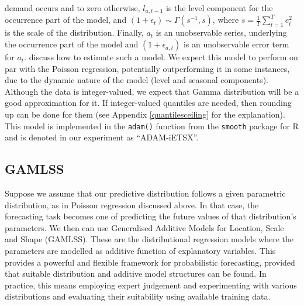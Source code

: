 \documentclass[]{elsarticle} %
\begin{document}
demand occurs and to zero otherwise, \(l_{a,t-1}\) is the level component
for the occurrence part of the model, and
\(\left(1+\epsilon_t \right) \sim \Gamma(s^{-1}, s)\), where
\(s=\frac{1}{T} \sum_{t=1}^{T} e_{t}^2\) is the scale of the distribution.
Finally, \(a_t\) is an unobservable series, underlying the occurrence part
of the model and \((1 + \epsilon_{a,t})\) is an unobservable error term
for \(a_t\). \citet{Svetunkov2019a} discuss how to estimate such a model. We
expect this model to perform on par with the Poisson regression,
potentially outperforming it in some instances, due to the dynamic
nature of the model (level and seasonal components). Although the data
is integer-valued, we expect that Gamma distribution will be a good
approximation for it. If integer-valued quantiles are needed, then
rounding up can be done for them (see Appendix \ref{quantilesceiling}
for the explanation). This model is implemented in the \texttt{adam()} function
from the \texttt{smooth} package \citep{Svetunkov2021Smooth} for R and is denoted in
our experiment as ``ADAM-iETSX''.

\hypertarget{gamlss}{%
\subsection{GAMLSS}\label{gamlss}}

Suppose we assume that our predictive distribution follows a given
parametric distribution, as in Poisson regression discussed above. In
that case, the forecasting task becomes one of predicting the future
values of that distribution's parameters. We then can use Generalised
Additive Models for Location, Scale and Shape (GAMLSS). These are the
distributional regression models where the parameters are modelled as
additive function of explanatory variables. This provides a powerful
and flexible framework for probabilistic forecasting, provided that
suitable distribution and additive model structures can be found. In
practice, this means employing expert judgement and experimenting with
various distributions and evaluating their suitability using available
training data.
\end{document}
